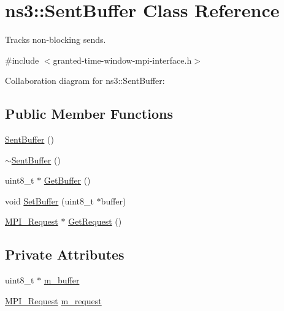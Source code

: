 \hypertarget{classns3_1_1SentBuffer}{}\section{ns3\+:\+:Sent\+Buffer Class Reference}
\label{classns3_1_1SentBuffer}


Tracks non-\/blocking sends.  




{\ttfamily \#include $<$granted-\/time-\/window-\/mpi-\/interface.\+h$>$}



Collaboration diagram for ns3\+:\+:Sent\+Buffer\+:
\subsection*{Public Member Functions}
\begin{DoxyCompactItemize}
\item 
\hyperlink{classns3_1_1SentBuffer_a6fea8dba857e0c125362e44ff8763f35}{Sent\+Buffer} ()
\item 
\hyperlink{classns3_1_1SentBuffer_a7633d1aa4f9e72cc0ec50adbbbb01221}{$\sim$\+Sent\+Buffer} ()
\item 
uint8\+\_\+t $\ast$ \hyperlink{classns3_1_1SentBuffer_a74589ed2b76040b71daf020e4b5de89e}{Get\+Buffer} ()
\item 
void \hyperlink{classns3_1_1SentBuffer_ab68d56e3080f765bb7077746e2681b41}{Set\+Buffer} (uint8\+\_\+t $\ast$buffer)
\item 
\hyperlink{granted-time-window-mpi-interface_8h_a31b372fd1cca939295900acb2a4961dd}{M\+P\+I\+\_\+\+Request} $\ast$ \hyperlink{classns3_1_1SentBuffer_a0c78663fb3d4080dba83b0900512d991}{Get\+Request} ()
\end{DoxyCompactItemize}
\subsection*{Private Attributes}
\begin{DoxyCompactItemize}
\item 
uint8\+\_\+t $\ast$ \hyperlink{classns3_1_1SentBuffer_a5dc66186a7909a1b28da55f367e33859}{m\+\_\+buffer}
\item 
\hyperlink{granted-time-window-mpi-interface_8h_a31b372fd1cca939295900acb2a4961dd}{M\+P\+I\+\_\+\+Request} \hyperlink{classns3_1_1SentBuffer_a092b3d662227c302e2dba47a29383497}{m\+\_\+request}
\end{DoxyCompactItemize}


